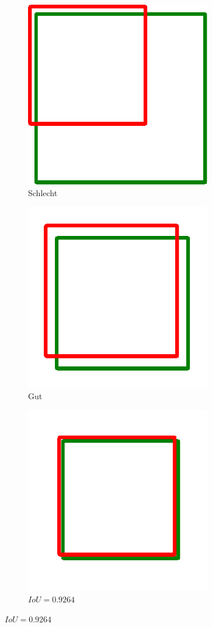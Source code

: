 \begin{figure}[h!]
    \captionsetup{width=.9\linewidth}
    \caption{Beispiele des Intersection over Union Mass}
    \label{fig:iou-examples}
    \centering
    \begin{subfigure}[b]{0.3\linewidth}
        \centering
        \caption*{$IoU=0.4034$}
        \includegraphics[width=0.5\linewidth]{graphics/iou/iou_examples/1.pdf}
        \caption*{Schlecht} 
        \vspace{2ex}
    \end{subfigure}%
    \begin{subfigure}[b]{0.3\linewidth}
        \centering
        \caption*{$IoU=0.7330$} 
        \includegraphics[width=0.5\linewidth]{graphics/iou/iou_examples/2.pdf}
        \caption*{Gut} 
        \vspace{2ex}
    \end{subfigure}%
    \begin{subfigure}[b]{0.3\linewidth}
        \centering
        \caption*{$IoU=0.9264$}
        \includegraphics[width=0.5\linewidth]{graphics/iou/iou_examples/3.pdf}

\end{subfigure}
\end{figure}
